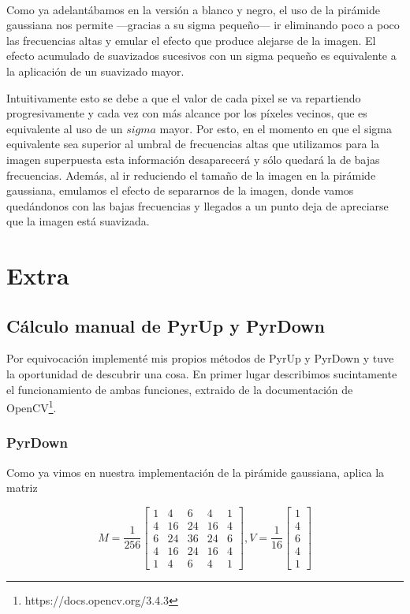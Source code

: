 \documentclass{article}
\newcommand{\img}[2]{
\noindent\makebox[\textwidth][c]{\texttt{[image: \#1]}}%
}
\begin{document}
\img{eximg/ej11_4}{0.8}
\\

\img{eximg/ej11_5}{0.8}

Como ya adelantábamos en la versión a blanco y negro, el uso de la pirámide gaussiana nos permite ---gracias a su sigma pequeño--- ir eliminando poco a poco las frecuencias altas y emular el efecto que produce alejarse de la imagen. El efecto acumulado de suavizados sucesivos con un sigma pequeño es equivalente a la aplicación de un suavizado mayor.

\img{eximg/ej11_gauss}{1.2}

Intuitivamente esto se debe a que el valor de cada pixel se va repartiendo progresivamente y cada vez con más alcance por los píxeles vecinos, que es equivalente al uso de un $sigma$ mayor. Por esto, en el momento en que el sigma equivalente sea superior al umbral de frecuencias altas que utilizamos para la imagen superpuesta esta información desaparecerá y sólo quedará la de bajas frecuencias. Además, al ir reduciendo el tamaño de la imagen en la pirámide gaussiana, emulamos el efecto de separarnos de la imagen, donde vamos quedándonos con las bajas frecuencias y llegados a un punto deja de apreciarse que la imagen está suavizada.

\section{Extra}

\subsection{Cálculo manual de PyrUp y PyrDown}
Por equivocación implementé mis propios métodos de PyrUp y PyrDown y tuve la oportunidad de descubrir una cosa. En primer lugar describimos sucintamente el funcionamiento de ambas funciones, extraido de la documentación de OpenCV\footnote{https://docs.opencv.org/3.4.3}.

\subsubsection{PyrDown}

Como ya vimos en nuestra implementación de la pirámide gaussiana, aplica la matriz 

\[M=\frac{1}{256} \begin{bmatrix} 1 & 4 & 6 & 4 & 1 \\ 4 & 16 & 24 & 16 & 4 \\ 6 & 24 & 36 & 24 & 6 \\ 4 & 16 & 24 & 16 & 4 \\ 1 & 4 & 6 & 4 & 1 \end{bmatrix}, V=\frac{1}{16} \begin{bmatrix} 1 \\ 4 \\ 6 \\ 4 \\ 1 \end{bmatrix}\]
\end{document}
